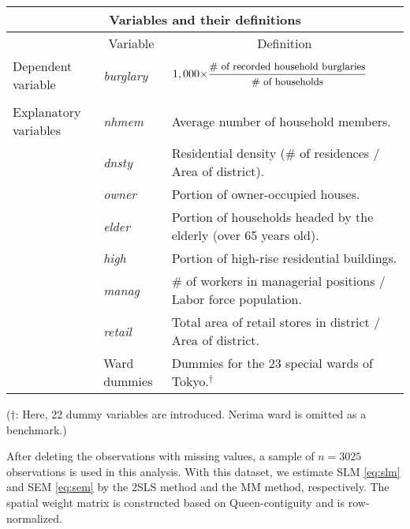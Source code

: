 \documentclass[11pt, A4paper, openany, uplatex]{book}
\begin{document}
\begin{center}
	\begin{tabular}{l|l|l}
		\multicolumn{3}{c}{ Variables and their definitions} \\ \hline\hline
				&  \multicolumn{1}{|c|}{\small Variable} &  \multicolumn{1}{|c}{\small Definition} \\ \hline
		\small Dependent variable & \small \textit{burglary} & ${\small 1,000\times }\dfrac{\text{{\small \# of recorded household burglaries}}}{\text{{\small \# of households}}}$ \\ 
		&  &  \\ 
		\small Explanatory variables & \small \textit{nhmem}  & \small Average number of household members. \\
													  & \small \textit{dnsty} & \small Residential density (\# of residences / Area of district). \\ 
		                                              & \small \textit{owner} & \small Portion of owner-occupied houses. \\
		                                              & \small \textit{elder}    & \small Portion of households headed by the elderly (over 65 years old). \\
		                                              & \small \textit{high}    & \small Portion of high-rise residential buildings. \\ 
		                                              & \small \textit{manag} & \small \# of workers in managerial positions / Labor force population. \\ 
		                                              & \small \textit{retail}      & \small Total area of retail stores in district / Area of district. \\ 
												     & \small Ward dummies & \small Dummies for the 23 special wards of Tokyo.$^\dagger$ \\ \hline
	\end{tabular}
	\begin{flushleft}
	($\dagger$: {\small Here, 22 dummy variables are introduced. Nerima ward is omitted as a benchmark.)}
	\end{flushleft}
\end{center}

After deleting the observations with missing values, a sample of $n = 3025$ observations is used in this analysis.
With this dataset, we estimate SLM \eqref{eq:slm} and SEM \eqref{eq:sem} by the 2SLS method and the MM method, respectively.
The spatial weight matrix is constructed based on Queen-contiguity and is row-normalized.
\end{document}
